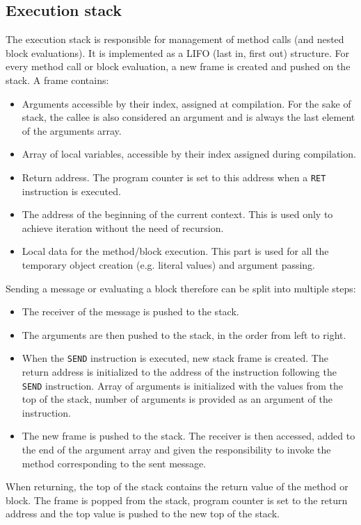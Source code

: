 \documentclass[thesis=M,english]{FITthesis}[2019/12/23]
\begin{document}
\subsection{Execution stack}
The execution stack is responsible for management of method calls (and nested block evaluations). It is implemented as a LIFO (last in, first out) structure.
For every method call or block evaluation, a new frame is created and pushed on the stack. A frame contains:
\begin{itemize}
	\item Arguments accessible by their index, assigned at compilation. For the sake of stack, the callee is also considered an argument and is always
		the last element of the arguments array.
	\item Array of local variables, accessible by their index assigned during compilation.
	\item Return address. The program counter is set to this address when a \texttt{RET} instruction is executed.
	\item The address of the beginning of the current context. This is used only to achieve iteration without the need of recursion.
	\item Local data for the method/block execution. This part is used for all the temporary object creation (e.g. literal values) and argument passing.
\end{itemize}

Sending a message or evaluating a block therefore can be split into multiple steps:
\begin{itemize}
	\item The receiver of the message is pushed to the stack.
	\item The arguments are then pushed to the stack, in the order from left to right.
	\item When the \texttt{SEND} instruction is executed, new stack frame is created. The return address is initialized to the address of the instruction
		following the \texttt{SEND} instruction. Array of arguments is initialized with the values from the top of the stack, number of arguments is provided
		as an argument of the instruction.
	\item The new frame is pushed to the stack. The receiver is then accessed, added to the end of the argument array and given the responsibility to invoke
		the method corresponding to the sent message.
\end{itemize}

When returning, the top of the stack contains the return value of the method or block. The frame is popped from the stack, program counter is set to the return
address and the top value is pushed to the new top of the stack.
\end{document}
